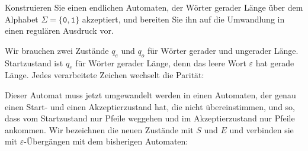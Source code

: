 Konstruieren Sie einen endlichen Automaten, der Wörter gerader Länge
über dem Alphabet $\Sigma=\{\texttt{0},\texttt{1}\}$ akzeptiert,
und bereiten Sie ihn auf die Umwandlung in einen regulären Ausdruck vor.

\begin{loesung}
Wir brauchen zwei Zustände $q_e$ und $q_o$ für Wörter gerader und
ungerader Länge.
Startzustand ist $q_e$ für Wörter gerader Länge, denn das leere Wort
$\varepsilon$ hat gerade Länge.
Jedes verarbeitete Zeichen wechselt die Parität:
\def\l{3}
\def\r{0.4}
\def\zustand#1#2#3{
        \draw[color=#3] #1 circle[radius=\r];
        \node[color=#3] at #1 {$#2\mathstrut$};
}
\def\akzeptierzustand#1#2#3{
        \zustand{#1}{#2}{#3}
        \draw[color=#3] #1 circle[radius={\r-0.05}];
}
\begin{center}
\end{center}
Dieser Automat muss jetzt umgewandelt werden in einen Automaten, der genau
einen Start- und einen Akzeptierzustand hat, die nicht übereinstimmen,
und so, dass vom Startzustand nur Pfeile weggehen und im Akzeptierzustand
nur Pfeile ankommen.
Wir bezeichnen die neuen Zustände mit $S$ und $E$ und verbinden sie mit
$\varepsilon$-Übergängen mit dem bisherigen Automaten:
\begin{center}
\end{center}
\end{loesung}

